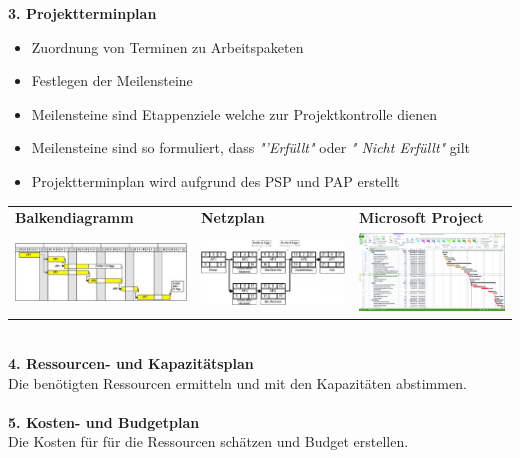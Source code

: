 \pagebreak
\textbf{3. Projektterminplan}
\begin{itemize}
	\item Zuordnung von Terminen zu Arbeitspaketen
	\item Festlegen der Meilensteine
	\item Meilensteine sind Etappenziele welche zur Projektkontrolle dienen
	\item Meilensteine sind so formuliert, dass \textit{"'Erfüllt"} oder \textit{" Nicht Erfüllt"} gilt
	\item Projektterminplan wird aufgrund des PSP und PAP erstellt
\end{itemize}
\begin{table}[h!]
	\begin{tabular}{l l l}
		 \textbf{Balkendiagramm} & \textbf{Netzplan} & \textbf{Microsoft Project} \\
		 \includegraphics[width=6cm]{images/balkendiagramm} & \includegraphics[width=6cm]{images/netzplan}	& \includegraphics[width=6cm]{images/msproject}	 
	\end{tabular}
\end{table}
\\
\textbf{4. Ressourcen- und Kapazitätsplan}\\
Die benötigten Ressourcen ermitteln und mit den Kapazitäten abstimmen. 
\\
\\
\textbf{5. Kosten- und Budgetplan}\\
Die Kosten für für die Ressourcen schätzen und Budget erstellen. 


